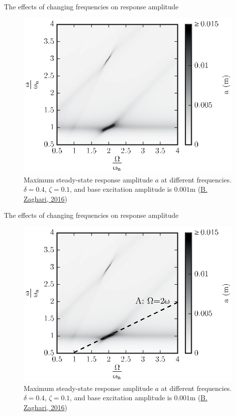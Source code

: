 \documentclass[LaTeX2e,10pt]{beamer}
\begin{document}
\begin{frame}{The effects of changing frequencies on response amplitude}
\begin{figure}
\centering
\includegraphics[width=0.7\linewidth]{Images/HighDamping_Amplitude_1.eps}
\caption{Maximum steady-state response amplitude $a$ at different frequencies. $\delta = 0.4$, $\zeta = 0.1$, and base excitation amplitude is $0.001$m (\href{https://eprints.soton.ac.uk/411397/1/BaharehZaghariPhDThesis.pdf}{B. Zaghari, 2016})} 
\end{figure}
\end{frame}
\begin{frame}{The effects of changing frequencies on response amplitude}
\begin{figure}
\centering
\includegraphics[width=0.7\linewidth]{Images/HighDamping_Amplitude_2.eps}
\caption{Maximum steady-state response amplitude $a$ at different frequencies. $\delta = 0.4$, $\zeta = 0.1$, and base excitation amplitude is $0.001$m (\href{https://eprints.soton.ac.uk/411397/1/BaharehZaghariPhDThesis.pdf}{B. Zaghari, 2016})}
\end{figure}
\end{frame}
\end{document}

